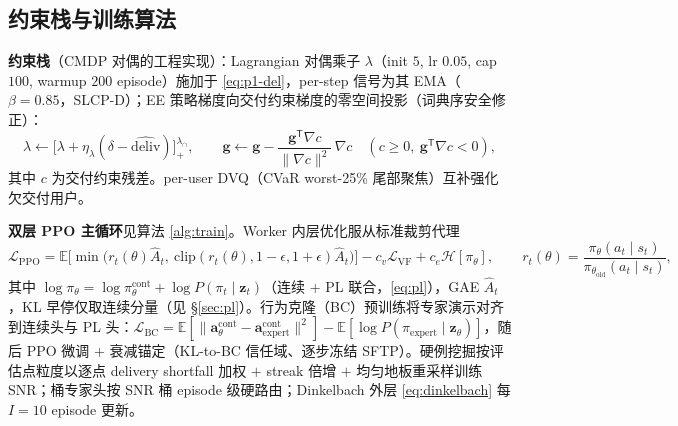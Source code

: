 \documentclass[UTF8,11pt,a4paper]{ctexart}
\theoremstyle{plain}
\theoremstyle{definition}
\theoremstyle{remark}
\newcommand{\E}{\mathbb{E}}
\newcommand{\vect}[1]{\mathbf{#1}}
\begin{document}
\subsection{约束栈与训练算法} \label{sec:train}

\textbf{约束栈}（CMDP 对偶的工程实现）：Lagrangian 对偶乘子 $\lambda$（init $5$, lr $0.05$, cap $100$, warmup $200$ episode）施加于 \eqref{eq:p1-del}，per-step 信号为其 EMA（$\beta=0.85$，SLCP-D）；EE 策略梯度向交付约束梯度的零空间投影（词典序安全修正）：
\begin{equation}
  \lambda \leftarrow \big[\lambda + \eta_\lambda(\delta - \widehat{\mathrm{deliv}})\big]_+^{\lambda_{\cap}},\qquad
  \vect g \leftarrow \vect g - \frac{\vect g^{\mathsf T}\nabla c}{\|\nabla c\|^2}\,\nabla c\quad (c\ge0,\ \vect g^{\mathsf T}\nabla c<0),
  \label{eq:lagproj}
\end{equation}
其中 $c$ 为交付约束残差。per-user DVQ（CVaR worst-25\% 尾部聚焦）互补强化欠交付用户。

\textbf{双层 PPO 主循环}见算法 \ref{alg:train}。Worker 内层优化服从标准裁剪代理
\begin{equation}
  \mathcal L_{\mathrm{PPO}} = \E\Big[\min\big(r_t(\theta)\hat A_t,\ \mathrm{clip}(r_t(\theta),1-\epsilon,1+\epsilon)\hat A_t\big)\Big]
  - c_v\mathcal L_{\mathrm{VF}} + c_e\mathcal H[\pi_\theta],
  \qquad r_t(\theta)=\frac{\pi_\theta(a_t\mid s_t)}{\pi_{\theta_{\mathrm{old}}}(a_t\mid s_t)},
  \label{eq:ppo}
\end{equation}
其中 $\log\pi_\theta = \log\pi_\theta^{\mathrm{cont}} + \log P(\pi_t\mid\vect z_t)$（连续 + PL 联合，\eqref{eq:pl}），GAE $\hat A_t$，KL 早停仅取连续分量（见 \S\ref{sec:pl}）。行为克隆（BC）预训练将专家演示对齐到连续头与 PL 头：$\mathcal L_{\mathrm{BC}}=\E[\|\vect a_\theta^{\mathrm{cont}}-\vect a_{\mathrm{expert}}^{\mathrm{cont}}\|^2] - \E[\log P(\pi_{\mathrm{expert}}\mid\vect z_\theta)]$，随后 PPO 微调 + 衰减锚定（KL-to-BC 信任域、逐步冻结 SFTP）。硬例挖掘按评估点粒度以逐点 delivery shortfall 加权 $+$ streak 倍增 $+$ 均匀地板重采样训练 SNR；桶专家头按 SNR 桶 episode 级硬路由；Dinkelbach 外层 \eqref{eq:dinkelbach} 每 $I{=}10$ episode 更新。
\end{document}
